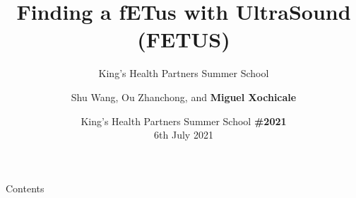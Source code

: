 \documentclass[xcolor={dvipsnames},aspectratio=169,10pt]{beamer}
\title{Finding a fETus with UltraSound (FETUS)}
\subtitle{King's Health Partners Summer School}
\author{
Shu Wang,
Ou Zhanchong, and
{\bf Miguel Xochicale}
}
\date{
King's Health Partners Summer School {\bf \#2021} \\
6th July 2021
}
\institute{
	\faEnvelope miguel.xochicale@kcl.ac.uk \\
	\faGithubAlt @mxochicale \faTwitter @\_mxochicale
		}
\begin{document}
\maketitle

\begin{frame}{Contents}
    \tableofcontents
\end{frame}








\maketitle
\end{document}
